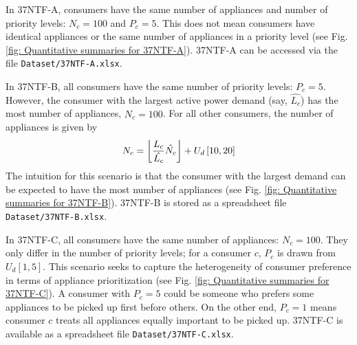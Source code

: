\documentclass[journal, a4paper]{IEEEtran}
\DeclarePairedDelimiter\floor{\lfloor}{\rfloor}
\begin{document}
In 37NTF-A, consumers have the same number of appliances and number of priority levels:
$N_{c} = 100$ and $P_{c} = 5$.
This does not mean consumers have identical appliances or the same number of appliances in a priority level
(see Fig. \ref{fig: Quantitative summaries for 37NTF-A}).
37NTF-A can be accessed via the file \texttt{Dataset/37NTF-A.xlsx}.

In 37NTF-B, all consumers have the same number of priority levels: $P_{c} = 5$.
However, the consumer with the largest active power demand (say, $\hat{L_{c}}$)
has the most number of appliances, $\hat{N_{c}} = 100$.
For all other consumers, the number of appliances is given by
\begin{equation*}
	N_{c} = \floor*{\frac{L_{c}}{\hat{L_{c}}} \hat{N_{c}}} + U_{d} \left[10,20\right]
\end{equation*}
The intuition for this scenario is that the consumer with the largest demand can be expected to have the most number of appliances
(see Fig. \ref{fig: Quantitative summaries for 37NTF-B}).
37NTF-B is stored as a spreadsheet file \texttt{Dataset/37NTF-B.xlsx}.

In 37NTF-C, all consumers have the same number of appliances: $N_{c} = 100$.
They only differ in the number of priority levels;
for a consumer $c$, $P_{c}$ is drawn from $U_{d} \left[1,5\right]$.
This scenario seeks to capture the heterogeneity of consumer preference in terms of appliance prioritization
(see Fig. \ref{fig: Quantitative summaries for 37NTF-C}).
A consumer with $P_{c} = 5$ could be someone who prefers some appliances to be picked up first before others.
On the other end, $P_{c} = 1$ means consumer $c$ treats all appliances equally important to be picked up.
37NTF-C is available as a spreadsheet file \texttt{Dataset/37NTF-C.xlsx}.
\end{document}
